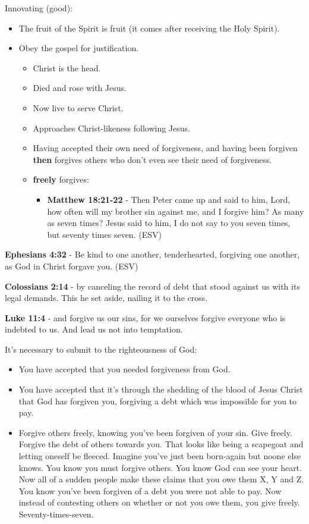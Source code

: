 \documentclass[11pt]{article}
\begin{document}
Innovating (good):
\begin{itemize}
\item The fruit of the Spirit is fruit (it comes after receiving the Holy Spirit).
\item Obey the gospel for justification.
\begin{itemize}
\item Christ is the head.
\item Died and rose with Jesus.
\item Now live to serve Christ.
\item Approaches Christ-likeness following Jesus.
\item Having accepted their own need of forgiveness, and having been forgiven \textbf{then} forgives others who don't even see their need of forgiveness.
\item \textbf{freely} forgives:
\begin{itemize}
\item \textbf{Matthew 18:21-22} -  Then Peter came up and said to him, Lord, how often will my brother sin against me, and I forgive him?  As many as seven times?  Jesus said to him, I do not say to you seven times, but seventy times seven.  (ESV)
\end{itemize}
\end{itemize}
\end{itemize}

\textbf{Ephesians 4:32} - Be kind to one another, tenderhearted, forgiving one another, as God in Christ forgave you. (ESV)

\textbf{Colossians 2:14} - by canceling the record of debt that stood against us with its legal demands. This he set aside, nailing it to the cross.

\textbf{Luke 11:4} - and forgive us our sins, for we ourselves forgive everyone who is indebted to us. And lead us not into temptation.

It's necessary to submit to the righteousness of God:
\begin{itemize}
\item You have accepted that you needed forgiveness from God.
\item You have accepted that it's through the shedding of the blood of Jesus Christ that God has forgiven you, forgiving a debt which was impossible for you to pay.
\item Forgive others freely, knowing you've been forgiven of your sin. Give freely. Forgive the debt of others towards you. That looks like being a scapegoat and letting oneself be fleeced. Imagine you've just been born-again but noone else knows. You know you must forgive others. You know God can see your heart. Now all of a sudden people make these claims that you owe them X, Y and Z. You know you've been forgiven of a debt you were not able to pay. Now instead of contesting others on whether or not you owe them, you give freely. Seventy-times-seven.
\end{itemize}
\end{document}
